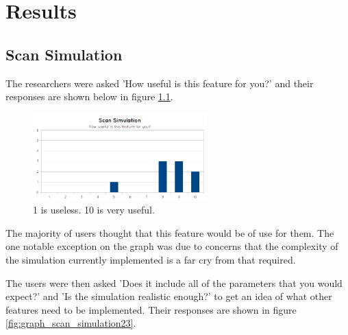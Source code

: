 \chapter{Results}


\section{Scan Simulation}
The researchers were asked 'How useful is this feature for you?' and their responses are shown below in figure \ref{fig:graph_scansimulation_1}.

\begin{figure}[h]
    \centering
	\includegraphics[width=0.6\textwidth]{images/evaluation/graph_scan_simulation_1.png}
    \caption{1 is useless. 10 is very useful.}\label{fig:graph_scansimulation_1}
\end{figure}

The majority of users thought that this feature would be of use for them. The one notable exception on the graph was due to concerns that the complexity of the simulation currently implemented is a far cry from that required.

The users were then asked 'Does it include all of the parameters that you would expect?' and 'Is the simulation realistic enough?' to get an idea of what other features need to be implemented. Their responses are shown in figure \ref{fig:graph_scan_simulation23}.

